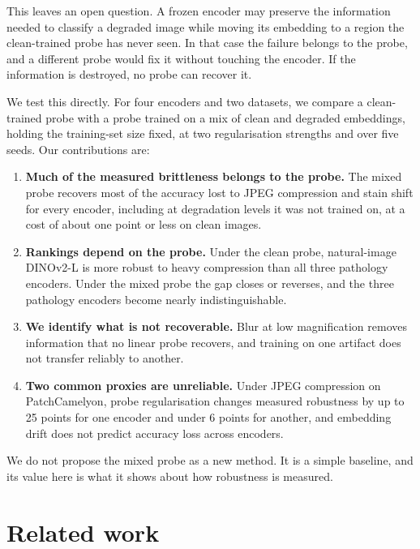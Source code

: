\documentclass[11pt,a4paper]{article}
\begin{document}
This leaves an open question. A frozen encoder may preserve the information needed to classify a degraded image while moving its embedding to a region the clean-trained probe has never seen. In that case the failure belongs to the probe, and a different probe would fix it without touching the encoder. If the information is destroyed, no probe can recover it.

We test this directly. For four encoders and two datasets, we compare a clean-trained probe with a probe trained on a mix of clean and degraded embeddings, holding the training-set size fixed, at two regularisation strengths and over five seeds. Our contributions are:

\begin{enumerate}
\item \textbf{Much of the measured brittleness belongs to the probe.} The mixed probe recovers most of the accuracy lost to JPEG compression and stain shift for every encoder, including at degradation levels it was not trained on, at a cost of about one point or less on clean images.
\item \textbf{Rankings depend on the probe.} Under the clean probe, natural-image DINOv2-L is more robust to heavy compression than all three pathology encoders. Under the mixed probe the gap closes or reverses, and the three pathology encoders become nearly indistinguishable.
\item \textbf{We identify what is not recoverable.} Blur at low magnification removes information that no linear probe recovers, and training on one artifact does not transfer reliably to another.
\item \textbf{Two common proxies are unreliable.} Under JPEG compression on PatchCamelyon, probe regularisation changes measured robustness by up to 25 points for one encoder and under 6 points for another, and embedding drift does not predict accuracy loss across encoders.
\end{enumerate}

We do not propose the mixed probe as a new method. It is a simple baseline, and its value here is what it shows about how robustness is measured.

\section{Related work}
\end{document}

